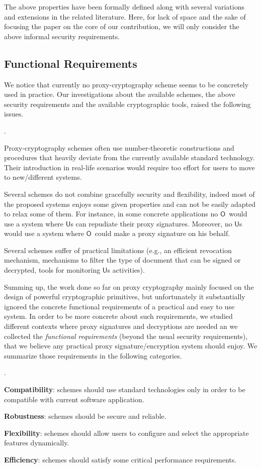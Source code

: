 \documentclass{sig-alternate}
\newcommand{\Owner}{\ensuremath{\mathsf{O}}}
\newcommand{\User}{\ensuremath{\mathsf{U}}}
\newcounter{itemcount}
\newenvironment{myenumerate}
{\setcounter{itemcount}{0}\begin{list}
{\arabic{itemcount}.}{\usecounter{itemcount} \itemindent=0.0cm
\itemsep=0.0in
\parsep=0.0in
\topsep=0.0in
\partopsep=0.0in}}{\end{list}}
\begin{document}
The above properties have been formally defined along with several variations and extensions in the related literature. Here, for lack of space and the sake of
focusing the paper on the core of our contribution, we will only consider the above informal security requirements.
\subsection{Functional Requirements}

We notice that currently no proxy-cryptography scheme seems to be concretely used in practice. Our investigations about the available schemes,
the above security requirements and the available cryptographic tools, raised the following issues.
\begin{myenumerate}
\item Proxy-cryptography schemes often use number-theoretic constructions and procedures that heavily deviate from the currently available standard technology.
Their introduction in real-life scenarios would require too effort for users to move to new/different systems.
\item Several schemes do not combine gracefully security and flexibility, indeed most of the proposed systems enjoys some given properties and can not be easily
adapted to relax some of them. For instance, in some concrete applications no \Owner\ would use a system where \User s can repudiate their proxy
signatures. Moreover, no \User s would use a system where \Owner\ could make a proxy signature on his behalf.
\item Several schemes suffer of practical limitations (e.g., an efficient revocation mechanism, mechanisms to filter the type of document that can be signed or decrypted,
tools for monitoring \User s activities).
\end{myenumerate}

Summing up, the work done so far on proxy cryptography mainly focused on the design of powerful cryptographic primitives, but unfortunately it substantially ignored the concrete functional requirements of a practical and easy to use system. In order to be more concrete about such requirements, we studied different contexts
where proxy signatures and decryptions are needed an we collected the \emph{functional requirements} (beyond the usual security requirements), that we believe
any practical proxy signature/encryption system should enjoy. We summarize those requirements in the following categories.
\begin{myenumerate}
\item {\bf Compatibility}: schemes should use standard technologies only in order to be compatible with current software application. 
\item {\bf Robustness}: schemes
should be secure and reliable.
\item {\bf Flexibility}: schemes should allow users to configure and select the appropriate features dynamically.
\item {\bf Efficiency}: schemes should satisfy some critical performance requirements.
\end{myenumerate}
\end{document}
